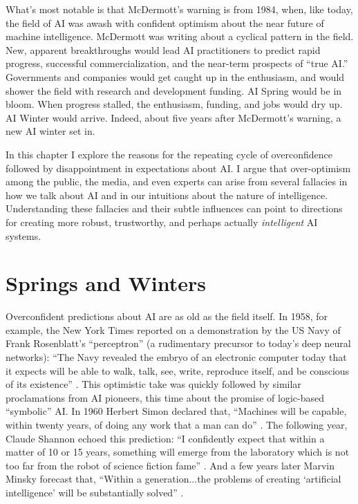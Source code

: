 \documentclass[12pt]{article}
\begin{document}
What's most notable is that McDermott's warning is from 1984, when, like today, the field of AI was awash with confident optimism about the near future of machine intelligence. McDermott was writing about a cyclical pattern in the field.  New, apparent breakthroughs would lead AI practitioners to predict rapid progress, successful commercialization, and the near-term prospects of ``true AI.'' Governments and companies would get caught up in the enthusiasm, and would shower the field with research and development funding.  AI Spring would be in bloom.  When progress stalled, the enthusiasm, funding, and jobs would dry up. AI Winter would arrive.  Indeed, about five years after McDermott's warning, a new AI winter set in.

In this chapter I explore the reasons for the repeating cycle of overconfidence followed by disappointment in expectations about AI.  I argue that over-optimism among the public, the media, and even experts can arise from several fallacies in how we talk about AI and in our intuitions about the nature of intelligence.  Understanding these fallacies and their subtle influences can point to directions for creating more robust, trustworthy, and perhaps actually \textit{intelligent} AI systems.

\section*{Springs and Winters}
Overconfident predictions about AI are as old as the field itself.  In 1958, for example, the New York Times reported on a demonstration by the US Navy of Frank Rosenblatt's ``perceptron'' (a rudimentary precursor to today's deep neural networks): ``The Navy revealed the embryo of an electronic computer today that it expects will be able to walk, talk, see, write, reproduce itself, and be conscious of its existence'' \cite{NYT1958}.  This optimistic take was quickly followed by similar proclamations from AI pioneers, this time about the promise of logic-based ``symbolic'' AI.  In 1960 Herbert Simon declared that, ``Machines will be capable, within twenty years, of doing any work that a man can do'' \cite{Simon1960}.  The following year, Claude Shannon echoed this prediction: ``I confidently expect that within a matter of 10 or 15 years, something will emerge from the laboratory which is not too far from the robot of science fiction fame'' \cite{Shannon1961}. And a few years later Marvin Minsky forecast that, ``Within a generation...the problems of creating ‘artificial intelligence' will be substantially solved'' \cite{Minsky1967}.
\end{document}
